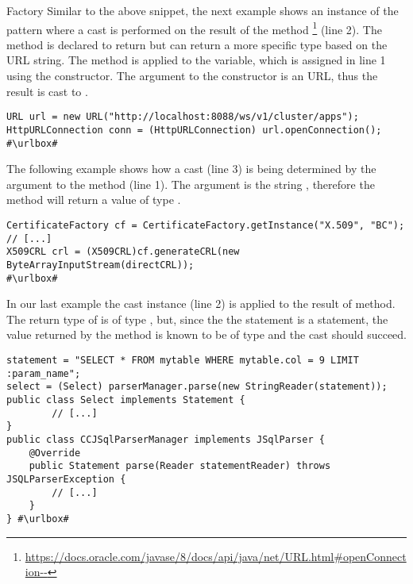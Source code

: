 \begin{pattern}{Factory}
Similar to the above snippet,
the next example shows an instance of the \thisp{} pattern where a cast is performed on the result of the  method%
\footnote{\url{https://docs.oracle.com/javase/8/docs/api/java/net/URL.html\#openConnection--}}
(line 2).
The method is declared to return  but can return a more specific type based on the URL string.
The  method is applied to the  variable,
which is assigned in line 1 using the  constructor.
The argument to the constructor is an  URL,
thus the result is cast to .
\def\urlvar{http://bit.ly/apache_hadoop_2E6KY6T}
\begin{verbatim}
URL url = new URL("http://localhost:8088/ws/v1/cluster/apps");
HttpURLConnection conn = (HttpURLConnection) url.openConnection();
#\urlbox#
\end{verbatim}

The following example shows how a cast (line 3) is being determined by the argument to the  method (line 1).
The argument is the string ,
therefore the method  will return a value of type .

\def\urlvar{http://bit.ly/bcgit_bc_java_2TEVScM}
\begin{verbatim}
CertificateFactory cf = CertificateFactory.getInstance("X.509", "BC");
// [...]
X509CRL crl = (X509CRL)cf.generateCRL(new ByteArrayInputStream(directCRL));
#\urlbox#
\end{verbatim}

In our last example the cast instance (line 2) is applied to the result of  method.
The return type of  is of type , but,
since the the statement is a  statement,
the value returned by the  method is known to be of type 
and the cast should succeed.
\def\urlvar{http://bit.ly/JSQLParser_JSqlParser_2TecMyB}
\begin{verbatim}
statement = "SELECT * FROM mytable WHERE mytable.col = 9 LIMIT :param_name";
select = (Select) parserManager.parse(new StringReader(statement));
public class Select implements Statement {
        // [...]
}
public class CCJSqlParserManager implements JSqlParser {
    @Override
    public Statement parse(Reader statementReader) throws JSQLParserException {
        // [...]
    }
} #\urlbox#
\end{verbatim}


\end{pattern}
